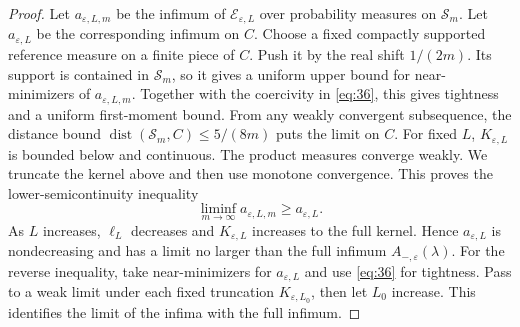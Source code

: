 \begin{proof}
Let $a_{\varepsilon,L,m}$ be the infimum of ${\mathcal E}_{\varepsilon,L}$ over
probability measures on $\mathcal S_m$. Let $a_{\varepsilon,L}$ be the
corresponding infimum on $C$. Choose a fixed compactly supported reference
measure on a finite piece of $C$. Push it by the real shift $1/(2m)$.
Its support is contained in $\mathcal S_m$, so it gives a uniform upper
bound for near-minimizers of $a_{\varepsilon,L,m}$. Together
with the coercivity in \eqref{eq:36}, this gives tightness and a uniform
first-moment bound. From any weakly convergent subsequence, the distance
bound $\operatorname{dist}({\mathcal S}_m,C)\le5/(8m)$ puts the limit on
$C$. For fixed $L$, $K_{\varepsilon,L}$ is bounded below and continuous. The
product measures converge weakly. We truncate the kernel above and then use
monotone convergence. This proves the lower-semicontinuity inequality
\begin{equation}
 \liminf_{m\to\infty}a_{\varepsilon,L,m}\ge a_{\varepsilon,L}.   \label{eq:37}
\end{equation}
As $L$ increases, $\ell_L$ decreases and $K_{\varepsilon,L}$ increases to the
full kernel. Hence $a_{\varepsilon,L}$ is nondecreasing and has a limit no
larger than the full infimum $A_{-,\varepsilon}(\lambda)$. For the reverse
inequality, take near-minimizers for $a_{\varepsilon,L}$ and use
\eqref{eq:36} for tightness. Pass to a weak limit under each fixed
truncation $K_{\varepsilon,L_0}$, then let $L_0$ increase. This identifies
the limit of the infima with the full infimum.


\end{proof}
